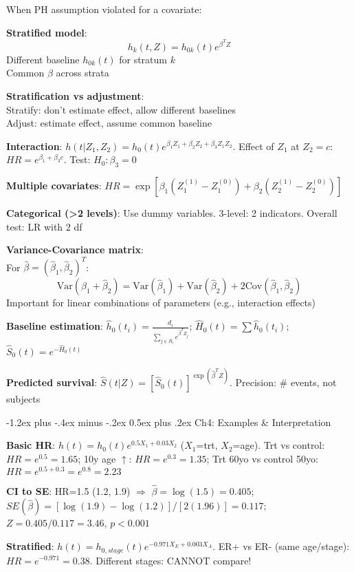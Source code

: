 ﻿\documentclass[10pt,letterpaper]{extarticle}
\makeatletter
\renewcommand{\section}{\@startsection{section}{1}{0mm}%
                                {-1.2ex plus -.4ex minus -.2ex}%
                                {0.5ex plus .2ex}%
                                {\normalfont\normalsize\bfseries}}
\newcommand{\h}[1]{\textbf{#1}}
\makeatother
\begin{document}
\begin{multicols}{3}
When PH assumption violated for a covariate:

\h{Stratified model}: \\
$$h_k(t, Z) = h_{0k}(t) e^{\beta^T Z}$$
Different baseline $h_{0k}(t)$ for stratum $k$ \\
Common $\beta$ across strata

\h{Stratification vs adjustment}: \\
Stratify: don't estimate effect, allow different baselines \\
Adjust: estimate effect, assume common baseline

\h{Interaction}: $h(t|Z_1,Z_2) = h_0(t)e^{\beta_1 Z_1+\beta_2 Z_2+\beta_3 Z_1 Z_2}$. Effect of $Z_1$ at $Z_2=c$: $HR=e^{\beta_1+\beta_3 c}$. Test: $H_0:\beta_3=0$

\h{Multiple covariates}: $HR = \exp[\beta_1(Z_1^{(1)}-Z_1^{(0)})+\beta_2(Z_2^{(1)}-Z_2^{(0)})]$

\h{Categorical (>2 levels)}: Use dummy variables. 3-level: 2 indicators. Overall test: LR with 2 df

\h{Variance-Covariance matrix}: \\
For $\hat{\beta} = (\hat{\beta}_1, \hat{\beta}_2)^T$: \\
$$\text{Var}(\hat{\beta}_1 + \hat{\beta}_2) = \text{Var}(\hat{\beta}_1) + \text{Var}(\hat{\beta}_2) + 2\text{Cov}(\hat{\beta}_1, \hat{\beta}_2)$$
Important for linear combinations of parameters (e.g., interaction effects)

\h{Baseline estimation}: $\hat{h}_0(t_i) = \frac{d_i}{\sum_{j \in R_i} e^{\hat{\beta}^T Z_j}}$; $\hat{H}_0(t)=\sum \hat{h}_0(t_i)$; $\hat{S}_0(t)=e^{-\hat{H}_0(t)}$

\h{Predicted survival}: $\hat{S}(t|Z) = [\hat{S}_0(t)]^{\exp(\hat{\beta}^T Z)}$. Precision: \# events, not subjects

\section{Ch4: Examples \& Interpretation}

\h{Basic HR}: $h(t)=h_0(t)e^{0.5 X_1+0.03 X_2}$ ($X_1$=trt, $X_2$=age). Trt vs control: $HR=e^{0.5}=1.65$; 10y age $\uparrow$: $HR=e^{0.3}=1.35$; Trt 60yo vs control 50yo: $HR=e^{0.5+0.3}=e^{0.8}=2.23$

\h{CI to SE}: HR=1.5 (1.2, 1.9) $\Rightarrow$ $\hat{\beta}=\log(1.5)=0.405$; $SE(\hat{\beta})=[\log(1.9)-\log(1.2)]/[2(1.96)]=0.117$; $Z=0.405/0.117=3.46$, $p<0.001$

\h{Stratified}: $h(t)=h_{0,stage}(t)e^{-0.971 X_E+0.003 X_A}$. ER+ vs ER- (same age/stage): $HR=e^{-0.971}=0.38$. Different stages: CANNOT compare!


\end{multicols}
\end{document}
